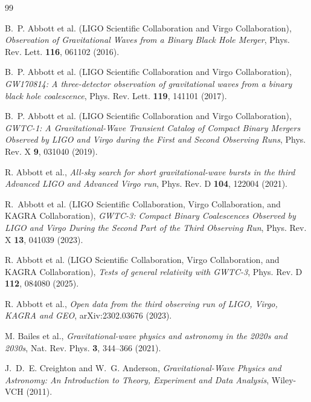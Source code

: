 \documentclass[11pt,a4paper]{article}
\begin{document}
\begin{thebibliography}{99}

B.~P. Abbott et al. (LIGO Scientific Collaboration and Virgo Collaboration),
\emph{Observation of Gravitational Waves from a Binary Black Hole Merger},
Phys. Rev. Lett. \textbf{116}, 061102 (2016).

B.~P. Abbott et al. (LIGO Scientific Collaboration and Virgo Collaboration),
\emph{GW170814: A three-detector observation of gravitational waves from a binary black hole coalescence},
Phys. Rev. Lett. \textbf{119}, 141101 (2017).

B.~P. Abbott et al. (LIGO Scientific Collaboration and Virgo Collaboration),
\emph{GWTC-1: A Gravitational-Wave Transient Catalog of Compact Binary Mergers Observed by LIGO and Virgo during the First and Second Observing Runs},
Phys. Rev. X \textbf{9}, 031040 (2019).

R. Abbott et al.,
\emph{All-sky search for short gravitational-wave bursts in the third Advanced LIGO and Advanced Virgo run},
Phys. Rev. D \textbf{104}, 122004 (2021).

R.~Abbott et al. (LIGO Scientific Collaboration, Virgo Collaboration, and KAGRA Collaboration),
\emph{GWTC-3: Compact Binary Coalescences Observed by LIGO and Virgo During the Second Part of the Third Observing Run},
Phys. Rev. X \textbf{13}, 041039 (2023).

R. Abbott et al. (LIGO Scientific Collaboration, Virgo Collaboration, and KAGRA Collaboration),
\emph{Tests of general relativity with GWTC-3},
Phys. Rev. D \textbf{112}, 084080 (2025).

R. Abbott et al.,
\emph{Open data from the third observing run of LIGO, Virgo, KAGRA and GEO},
arXiv:2302.03676 (2023).

M. Bailes et al.,
\emph{Gravitational-wave physics and astronomy in the 2020s and 2030s},
Nat. Rev. Phys. \textbf{3}, 344--366 (2021).

J.~D.~E. Creighton and W.~G. Anderson,
\emph{Gravitational-Wave Physics and Astronomy: An Introduction to Theory, Experiment and Data Analysis},
Wiley-VCH (2011).


\end{thebibliography}
\end{document}

